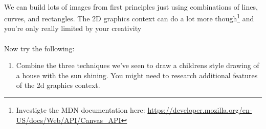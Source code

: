 \documentclass[10pt, a4paper]{article}
\begin{document}
\paragraph{} We can build lots of images from first principles just using combinations of lines, curves, and rectangles. The 2D graphics context can do a lot more though\footnote{Investigte the MDN documentation here: \url{https://developer.mozilla.org/en-US/docs/Web/API/Canvas_API}} and you're only really limited by your creativity


\paragraph{} Now try the following:
\begin{enumerate}
\item Combine the three techniques we've seen to draw a childrens style drawing of a house with the sun shining. You might need to research additional features of the 2d graphics context.
\end{enumerate}
\end{document}
